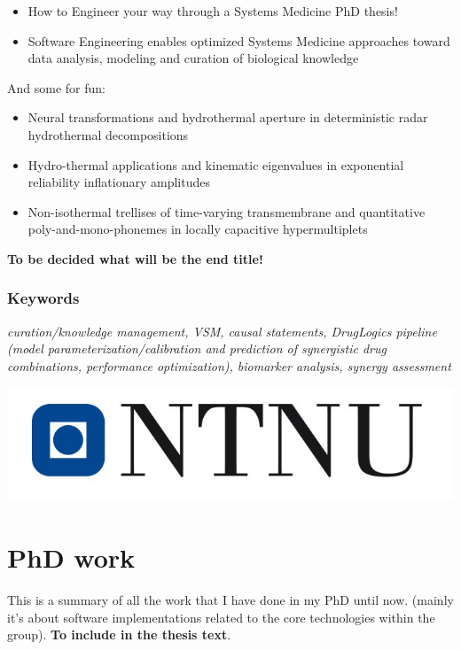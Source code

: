 \documentclass[
  12pt,
]{book}
\providecommand{\tightlist}{%
  \setlength{\itemsep}{0pt}\setlength{\parskip}{0pt}}
\begin{document}
\begin{itemize}
\tightlist
\item
  How to Engineer your way through a Systems Medicine PhD thesis!
\item
  Software Engineering enables optimized Systems Medicine approaches toward data analysis, modeling and curation of biological knowledge
\end{itemize}

And some for fun:

\begin{itemize}
\tightlist
\item
  Neural transformations and hydrothermal aperture in deterministic radar hydrothermal decompositions
\item
  Hydro-thermal applications and kinematic eigenvalues in exponential reliability inflationary amplitudes
\item
  Non-isothermal trellises of time-varying transmembrane and quantitative poly-and-mono-phonemes in locally capacitive hypermultiplets
\end{itemize}

\textbf{To be decided what will be the end title!}

\hypertarget{keywords}{%
\subsection*{Keywords}\label{keywords}}

\emph{curation/knowledge management, VSM, causal statements, DrugLogics pipeline
(model parameterization/calibration and prediction of synergistic drug combinations, performance optimization), biomarker analysis, synergy assessment}

\begin{center}\includegraphics[width=0.5\linewidth]{img/NTNU-logo} \end{center}

\hypertarget{work}{%
\chapter{PhD work}\label{work}}

This is a summary of all the work that I have done in my PhD until now.
(mainly it's about software implementations related to the core technologies
within the group). \textbf{To include in the thesis text}.
\end{document}
